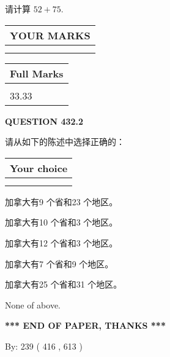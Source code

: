 \documentclass{ctexart}
\begin{document}
  
 
请计算 $ %
52 +  %
75 $.
 

 

 
  
\vspace{0.2in}
  
\noindent\begin{tabular}{|l|}
\hline
 YOUR MARKS  \\
\hline
 \\ 
 \\ 
\hline
\end{tabular}
\hspace{0.05in} \begin{tabular}{|l|}
\hline
 Full Marks  \\
\hline
 \\ 
33.33 \\
\hline
\end{tabular}
{\textbf{\Large{QUESTION
432.2 
}}}
  
  
请从如下的陈述中选择正确的：
  
  
\noindent\hspace{3.0in} \begin{tabular}{|l|}
\hline
Your choice \\
\hline
 \\ 
 \\ 
\hline
\end{tabular}
  
  
 
 
加拿大有9 个省和23 个地区。
 
 
加拿大有10 个省和3 个地区。
 
 
加拿大有12 个省和3 个地区。
 
 
加拿大有7 个省和9 个地区。
 
 
加拿大有25 个省和31 个地区。
 
 
 None of above.
 
 
   
   
 \vspace{0.2in}
 
   
   
   
   
\vspace{1.0in} 
{\textbf{\large{ *** END OF PAPER, THANKS *** }}} 
   
   
\hspace{1.0in} By: 
 239 ( 416 ,  613 )
   
\end{document}
